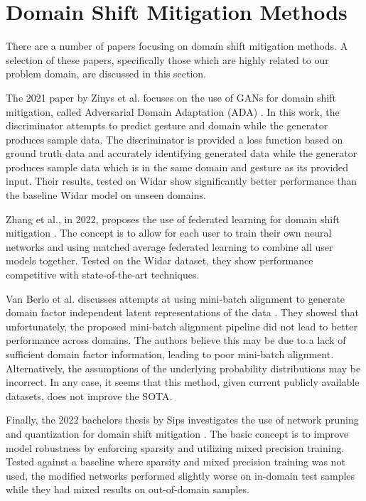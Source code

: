 \section{Domain Shift Mitigation Methods}

There are a number of papers focusing on domain shift mitigation methods.
A selection of these papers, specifically those which are highly related to our problem domain, are discussed in this section.

The 2021 paper by Zinys et al. focuses on the use of GANs for domain shift mitigation, called Adversarial Domain Adaptation (ADA) \cite{zinys2021domain}.
In this work, the discriminator attempts to predict gesture and domain while the generator produces sample data.
The discriminator is provided a loss function based on ground truth data and accurately identifying generated data while the generator produces sample data which is in the same domain and gesture as its provided input.
Their results, tested on Widar show significantly better performance than the baseline Widar model on unseen domains.

Zhang et al., in 2022, proposes the use of federated learning for domain shift mitigation \cite{zhang2022wifi}.
The concept is to allow for each user to train their own neural networks and using matched average federated learning to combine all user models together.
Tested on the Widar dataset, they show performance competitive with state-of-the-art techniques.

Van Berlo et al. discusses attempts at using mini-batch alignment to generate domain factor independent latent representations of the data \cite{van2022insights}.
They showed that unfortunately, the proposed mini-batch alignment pipeline did not lead to better performance across domains.
The authors believe this may be due to a lack of sufficient domain factor information, leading to poor mini-batch alignment.
Alternatively, the assumptions of the underlying probability distributions may be incorrect.
In any case, it seems that this method, given current publicly available datasets, does not improve the SOTA.

Finally, the 2022 bachelors thesis by Sips investigates the use of network pruning and quantization for domain shift mitigation \cite{sips2022impact}.
The basic concept is to improve model robustness by enforcing sparsity and utilizing mixed precision training.
Tested against a baseline where sparsity and mixed precision training was not used, the modified networks performed slightly worse on in-domain test samples while they had mixed results on out-of-domain samples.


